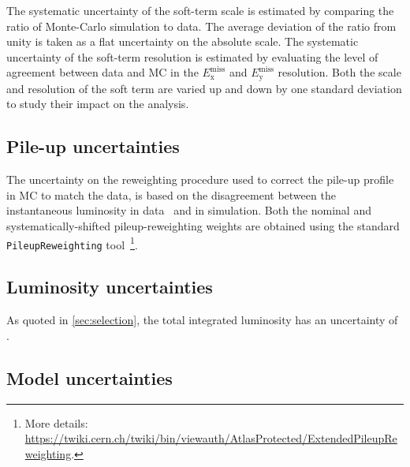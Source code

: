 The systematic uncertainty of the soft-term scale is estimated by comparing the ratio of Monte-Carlo simulation to data. The average deviation of the ratio from unity is taken as a flat uncertainty on the absolute scale. The systematic uncertainty of the soft-term resolution is estimated by evaluating the level of agreement between data and MC in the $E^{\text{miss}}_{\text{x}}$ and $E^{\text{miss}}_{\text{y}}$ resolution. Both the scale and resolution of the soft term are varied up and down by one standard deviation to study their impact on the analysis. 

\subsection*{Pile-up uncertainties}

The uncertainty on the reweighting procedure used to correct the pile-up profile in MC to match the data, is based on the disagreement between the instantaneous luminosity in data~\cite{DAPR-2013-01} and in simulation. Both the nominal and systematically-shifted pileup-reweighting weights are obtained using the standard \texttt{PileupReweighting} tool~\footnote{More details: \url{https://twiki.cern.ch/twiki/bin/viewauth/AtlasProtected/ExtendedPileupReweighting}.}. 

\subsection*{Luminosity uncertainties}

As quoted in \cref{sec:selection}, the total integrated luminosity has an uncertainty of \intlumiunc.



\subsection{Model uncertainties}
\label{sec:theoretical_uncertainties}



